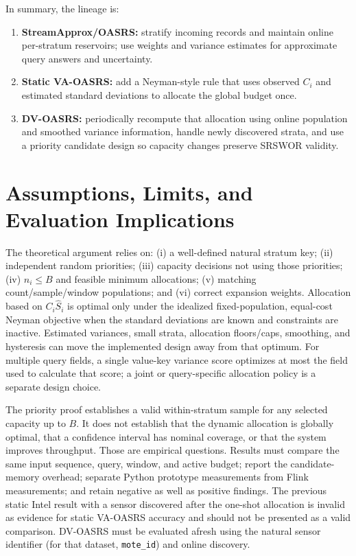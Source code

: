 \documentclass[11pt]{article}
\begin{document}
In summary, the lineage is:
\begin{enumerate}[label=\arabic*.]
 \item \textbf{StreamApprox/OASRS:} stratify incoming records and maintain online per-stratum reservoirs; use weights and variance estimates for approximate query answers and uncertainty.
 \item \textbf{Static VA-OASRS:} add a Neyman-style rule that uses observed $C_i$ and estimated standard deviations to allocate the global budget once.
 \item \textbf{DV-OASRS:} periodically recompute that allocation using online population and smoothed variance information, handle newly discovered strata, and use a priority candidate design so capacity changes preserve SRSWOR validity.
\end{enumerate}

\section{Assumptions, Limits, and Evaluation Implications}

The theoretical argument relies on: (i) a well-defined natural stratum key; (ii) independent random priorities; (iii) capacity decisions not using those priorities; (iv) $n_i\le B$ and feasible minimum allocations; (v) matching count/sample/window populations; and (vi) correct expansion weights. Allocation based on $C_i\widehat{S}_i$ is optimal only under the idealized fixed-population, equal-cost Neyman objective when the standard deviations are known and constraints are inactive. Estimated variances, small strata, allocation floors/caps, smoothing, and hysteresis can move the implemented design away from that optimum. For multiple query fields, a single value-key variance score optimizes at most the field used to calculate that score; a joint or query-specific allocation policy is a separate design choice.

The priority proof establishes a valid within-stratum sample for any selected capacity up to $B$. It does not establish that the dynamic allocation is globally optimal, that a confidence interval has nominal coverage, or that the system improves throughput. Those are empirical questions. Results must compare the same input sequence, query, window, and active budget; report the candidate-memory overhead; separate Python prototype measurements from Flink measurements; and retain negative as well as positive findings. The previous static Intel result with a sensor discovered after the one-shot allocation is invalid as evidence for static VA-OASRS accuracy and should not be presented as a valid comparison. DV-OASRS must be evaluated afresh using the natural sensor identifier (for that dataset, \texttt{mote\_id}) and online discovery.
\end{document}
